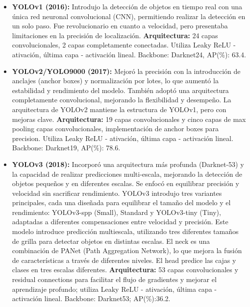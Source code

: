 \begin{itemize}
     
    \item \textbf{YOLOv1 (2016):} Introdujo la detección de objetos en tiempo real con una única red neuronal convolucional (CNN), permitiendo realizar la detección en un solo paso. Fue revolucionario en cuanto a velocidad, pero presentaba limitaciones en la precisión de localización.
    \textbf{Arquitectura:} 24 capas convolucionales, 2 capas completamente conectadas. Utiliza Leaky ReLU - ativación, última capa - activación lineal. Backbone: Darknet24, AP(\%): 63.4.
    
    \item \textbf{YOLOv2/YOLO9000 (2017):} Mejoró la precisión con la introducción de anclajes (anchor boxes) y normalización por lotes, lo que aumentó la estabilidad y rendimiento del modelo. También adoptó una arquitectura completamente convolucional, mejorando la flexibilidad y desempeño. La arquitectura de YOLOv2 mantiene la estructura de YOLOv1, pero con mejoras clave. 
    \textbf{Arquitectura:} 19 capas convolucionales y cinco capas de max pooling capas convolucionales, implementación de anchor boxes para precision. Utiliza Leaky ReLU - ativación, última capa - activación lineal. Backbone: Darknet19, AP(\%): 78.6.
    
    \item \textbf{YOLOv3 (2018):} Incorporó una arquitectura más profunda (Darknet-53) y la capacidad de realizar predicciones multi-escala, mejorando la detección de objetos pequeños y en diferentes escalas. Se enfocó en equilibrar precisión y velocidad sin sacrificar rendimiento. YOLOv3 introdujo tres variantes principales, cada una diseñada para equilibrar el tamaño del modelo y el rendimiento: YOLOv3-spp (Small), Standard y YOLOv3-tiny (Tiny), adaptadas a diferentes compensaciones entre velocidad y precisión.  Este modelo introduce predicción multiescala, utilizando tres diferentes tamaños de grilla para detectar objetos en distintas escalas. El neck es una combinación de PANet (Path Aggregation Network), lo que mejora la fusión de características a través de diferentes niveles. El head predice las cajas y clases en tres escalas diferentes.
    \textbf{Arquitectura:} 53 capas convolucionales y residual connections para facilitar el flujo de gradientes y mejorar el aprendizaje profundo; utiliza Leaky ReLU - ativación, última capa - activación lineal. Backbone: Darknet53; AP(\%):36.2.
    

\end{itemize}
